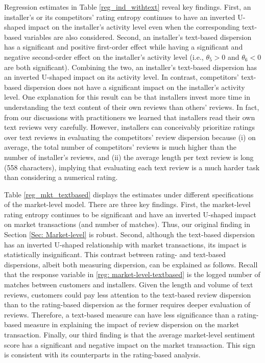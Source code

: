 \documentclass[mnsc,blindrev]{informs3}
\begin{document}
{\color{blue} Regression estimates in Table \ref{reg_ind_withtext} reveal key findings. First, an installer's or its competitors' rating entropy continues to have an inverted U-shaped impact on the installer's activity level even when the corresponding text-based variables are also considered.  Second, an installer's text-based dispersion has a significant and positive first-order effect while having a significant and negative second-order effect on the installer's activity level (i.e., $\theta_{5} > 0$ and $\theta_{6} < 0$ are both significant). Combining the two, an installer's text-based dispersion has an inverted U-shaped impact on its activity level. In contrast, competitors' text-based dispersion does not have a significant impact on the installer's activity level. One explanation for this result can be that installers invest more time in understanding the text content of their own reviews than others' reviews. In fact, from our discussions with practitioners we learned that installers read their own text reviews very carefully. However, installers can conceivably prioritize ratings over text reviews in evaluating the competitors' review dispersion because (i) on average, the total number of competitors' reviews is much higher than the number of installer's reviews, and (ii) the average length per text review is long (558 characters), implying that evaluating each text review is a much harder task than considering a numerical rating.}


	
{\color{blue}Table \ref{reg_mkt_textbased} displays the estimates under different specifications of the market-level model. There are three key findings. First, the  market-level rating entropy continues to be significant and have an inverted U-shaped impact on market transactions (and number of matches). Thus, our original finding in Section \ref{Sec: Market-level} is robust. Second, although the text-based dispersion has an inverted U-shaped relationship with market transactions, its impact is statistically insignificant.  This contrast between rating- and text-based dispersions, albeit both measuring dispersion, can be explained as follows. Recall that the response variable in \eqref{reg: market-level-textbased} is the logged number of matches between customers and installers. Given the length and volume of text reviews, customers could pay less attention to the text-based review dispersion than to the rating-based dispersion as the former requires deeper evaluation of reviews. Therefore, a text-based measure can have less significance than a rating-based measure in explaining the impact of review dispersion on the market transaction.  Finally, our third finding is that the average market-level sentiment score has a significant and negative impact on the market transaction. This sign is consistent with its counterparts in the rating-based analysis.}
\end{document}
